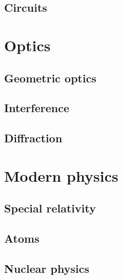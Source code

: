 \documentclass{../../large}
\begin{document}
\section{Circuits}






\chapter{Optics}
\section{Geometric optics}

\section{Interference}

\section{Diffraction}


\chapter{Modern physics}
\section{Special relativity}

\section{Atoms}
% 
\section{Nuclear physics}
\end{document}
